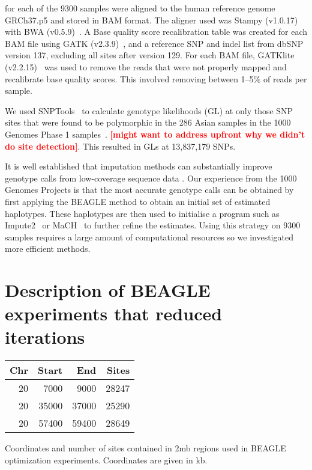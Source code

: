 \documentclass[nobib,a4paper]{tufte-handout}
\newcommand{\red}[1]{\textsf{\textbf{\textcolor{red}{[#1]}}}}
\begin{document}



 for each of the 9300 samples were aligned to the
human reference genome GRCh37.p5 and stored in BAM format. 
The aligner used was Stampy (v1.0.17)~\autocite{Lunter2011} with
BWA (v0.5.9)~\autocite{Li2009}. 
A Base quality score recalibration table was created for each BAM file
using GATK (v2.3.9)~\autocite{McKenna2010,Trio2011}, and a
reference SNP and indel list from dbSNP version 137, excluding all
  sites after version 129. 
For each BAM file, GATKlite (v2.2.15)~\autocite{McKenna2010,Trio2011} was
used to remove the reads that were not properly mapped and recalibrate
base quality scores. This involved removing between 1--5$\%$ of reads
per sample. 

We used SNPTools~\autocite{Wang2013} to calculate genotype likelihoods (GL) at only those
SNP sites that were found to be polymorphic in the 286 Asian samples
in the 1000 Genomes Phase 1 samples~\autocite{Project2012}. \red{might want to
  address upfront why we didn't do site detection}. This resulted in
GLs at 13,837,179 SNPs. 

It is well established that imputation methods can substantially
improve genotype calls from low-coverage sequence data
\autocite{Project2012, Li2010, Wang2013}.
Our experience from the 1000 Genomes Projects is that the most
accurate genotype calls can be obtained by first applying the BEAGLE
method to obtain an initial set of estimated haplotypes. These
haplotypes are then used to initialise a program such as
Impute2~\autocite{Howie2009} or MaCH~\autocite{Li2010} to further refine the
estimates. 
Using this strategy on 9300 samples requires a large amount of
computational resources so we investigated more efficient methods.  

\section{Description of BEAGLE experiments that reduced iterations}

\begin{margintable}[1.5in]
  \begin{tabular}{rrrr}
    \toprule
    Chr & Start & End & Sites\\
    \midrule
    20 & 7000 & 9000 & 28247\\
    20 & 35000 & 37000 & 25290\\
    20 & 57400 & 59400 & 28649\\
    \bottomrule
  \end{tabular}
  \caption{Coordinates and number of sites contained in 2mb regions
    used in BEAGLE optimization experiments.  Coordinates are given in
    kb.}
  \label{tab:2mbChunks}
\end{margintable}
\end{document}
